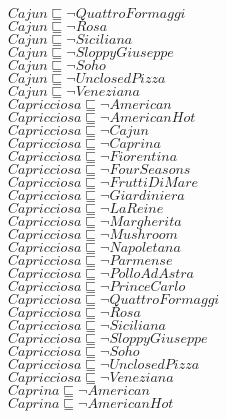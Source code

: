 \documentclass[a4paper,10pt]{article}
\begin{document}
 $Cajun \sqsubseteq  \lnot QuattroFormaggi$\\ 
 $Cajun \sqsubseteq  \lnot Rosa$\\ 
 $Cajun \sqsubseteq  \lnot Siciliana$\\ 
 $Cajun \sqsubseteq  \lnot SloppyGiuseppe$\\ 
 $Cajun \sqsubseteq  \lnot Soho$\\ 
 $Cajun \sqsubseteq  \lnot UnclosedPizza$\\ 
 $Cajun \sqsubseteq  \lnot Veneziana$\\ 
 $Capricciosa \sqsubseteq  \lnot American$\\ 
 $Capricciosa \sqsubseteq  \lnot AmericanHot$\\ 
 $Capricciosa \sqsubseteq  \lnot Cajun$\\ 
 $Capricciosa \sqsubseteq  \lnot Caprina$\\ 
 $Capricciosa \sqsubseteq  \lnot Fiorentina$\\ 
 $Capricciosa \sqsubseteq  \lnot FourSeasons$\\ 
 $Capricciosa \sqsubseteq  \lnot FruttiDiMare$\\ 
 $Capricciosa \sqsubseteq  \lnot Giardiniera$\\ 
 $Capricciosa \sqsubseteq  \lnot LaReine$\\ 
 $Capricciosa \sqsubseteq  \lnot Margherita$\\ 
 $Capricciosa \sqsubseteq  \lnot Mushroom$\\ 
 $Capricciosa \sqsubseteq  \lnot Napoletana$\\ 
 $Capricciosa \sqsubseteq  \lnot Parmense$\\ 
 $Capricciosa \sqsubseteq  \lnot PolloAdAstra$\\ 
 $Capricciosa \sqsubseteq  \lnot PrinceCarlo$\\ 
 $Capricciosa \sqsubseteq  \lnot QuattroFormaggi$\\ 
 $Capricciosa \sqsubseteq  \lnot Rosa$\\ 
 $Capricciosa \sqsubseteq  \lnot Siciliana$\\ 
 $Capricciosa \sqsubseteq  \lnot SloppyGiuseppe$\\ 
 $Capricciosa \sqsubseteq  \lnot Soho$\\ 
 $Capricciosa \sqsubseteq  \lnot UnclosedPizza$\\ 
 $Capricciosa \sqsubseteq  \lnot Veneziana$\\ 
 $Caprina \sqsubseteq  \lnot American$\\ 
 $Caprina \sqsubseteq  \lnot AmericanHot$\\ 
\end{document}
